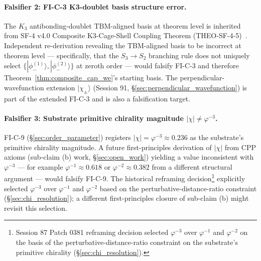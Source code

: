 \documentclass[11pt,letterpaper]{article}
\newcommand{\phig}{\varphi}
\newcommand{\Kthree}{\ensuremath{K_3}}
\newcommand{\phiminusOne}{|\phi_-^{(1)}\rangle}
\newcommand{\phiminusTwo}{|\phi_-^{(2)}\rangle}
\newcommand{\Sthree}{S_3}
\begin{document}
\paragraph{Falsifier 2: FI-C-3 K3-doublet basis structure error.}
The $\Kthree$ antibonding-doublet TBM-aligned basis at theorem level is inherited from SF-4 v4.0 Composite K3-Cage-Shell Coupling Theorem (THEO-SF-4-5)~\cite{abshier_sf4}. Independent re-derivation revealing the TBM-aligned basis to be incorrect at theorem level --- specifically, that the $\Sthree \to S_2$ branching rule does not uniquely select $\{\phiminusOne, \phiminusTwo\}$ at zeroth order --- would falsify FI-C-3 and therefore Theorem~\ref{thm:composite_cap_we}'s starting basis. The perpendicular-wavefunction extension $|\chi_\pm\rangle$ (Session 91, \S\ref{sec:perpendicular_wavefunction}) is part of the extended FI-C-3 and is also a falsification target.

\paragraph{Falsifier 3: Substrate primitive chirality magnitude $|\chi| \neq \phig^{-3}$.}
FI-C-9 (\S\ref{sec:order_parameter}) registers $|\chi| = \phig^{-3} \approx 0.236$ as the substrate's primitive chirality magnitude. A future first-principles derivation of $|\chi|$ from CPP axioms (sub-claim (b) work, \S\ref{sec:open_work}) yielding a value inconsistent with $\phig^{-3}$ --- for example $\phig^{-1} \approx 0.618$ or $\phig^{-2} \approx 0.382$ from a different structural argument --- would falsify FI-C-9. The historical reframing decision\footnote{Session 87 Patch 0381 reframing decision selected $\phig^{-3}$ over $\phig^{-1}$ and $\phig^{-2}$ on the basis of the perturbative-distance-ratio constraint on the substrate's primitive chirality (\S\ref{sec:chi_resolution}).} explicitly selected $\phig^{-3}$ over $\phig^{-1}$ and $\phig^{-2}$ based on the perturbative-distance-ratio constraint (\S\ref{sec:chi_resolution}); a different first-principles closure of sub-claim (b) might revisit this selection.
\end{document}
